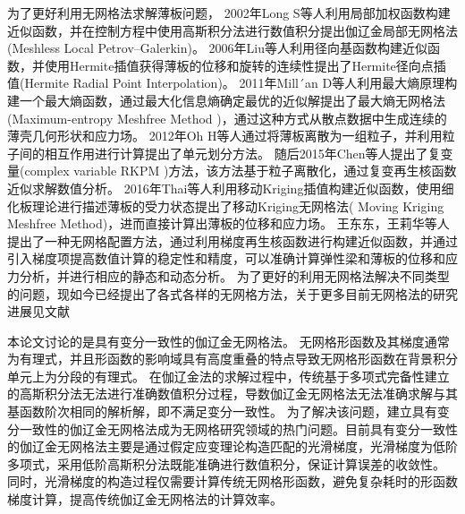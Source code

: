 为了更好利用无网格法求解薄板问题，
2002年Long S等人\textsuperscript{\cite{long2002}}利用局部加权函数构建近似函数，并在控制方程中使用高斯积分法进行数值积分提出伽辽金局部无网格法(Meshless Local Petrov–Galerkin)。
2006年Liu等人\textsuperscript{\cite{liu2006}}利用径向基函数构建近似函数，并使用Hermite插值获得薄板的位移和旋转的连续性提出了Hermite径向点插值(Hermite Radial Point Interpolation)。
2011年Mill´an D等人\textsuperscript{\cite{millan2011}}利用最大熵原理构建一个最大熵函数，通过最大化信息熵确定最优的近似解提出了最大熵无网格法(Maximum-entropy Meshfree  Method )，通过这种方式从散点数据中生成连续的薄壳几何形状和应力场。
2012年Oh H等人\textsuperscript{\cite{oh2012}}通过将薄板离散为一组粒子，并利用粒子间的相互作用进行计算提出了单元划分方法。
随后2015年Chen等人\textsuperscript{\cite{chen2015}}提出了复变量(complex variable RKPM )方法，该方法基于粒子离散化，通过复变再生核函数近似求解数值分析。
2016年Thai等人\textsuperscript{\cite{thai2016}}利用移动Kriging插值构建近似函数，使用细化板理论进行描述薄板的受力状态提出了移动Kriging无网格法( Moving Kriging Meshfree Method)，进而直接计算出薄板的位移和应力场。
王东东，王莉华等人\textsuperscript{\cite{wang2020,wang2021}}提出了一种无网格配置方法，通过利用梯度再生核函数进行构建近似函数，并通过引入梯度项提高数值计算的稳定性和精度，可以准确计算弹性梁和薄板的位移和应力分析，并进行相应的静态和动态分析。
为了更好的利用无网格法解决不同类型的问题，现如今已经提出了各式各样的无网格方法\textsuperscript{\cite{ChengYuMin2005,TanXianYun2011,LianYanPing2013,ZhangXiong2017,GaoXiaoWei2019}}，关于更多目前无网格法的研究进展见文献\textsuperscript{\cite{nguyen2008,liu2009,张雄2009无网格法的理论及应用,wang2014,yreux2017,koester2019,rohit2018,王莉华2021配点型无网格法理论和研究进展,LiuYuXiang2021,朱志辉2021基于,sriram2021,ChenJian2022,LiYuDong2022}}
\par
本论文讨论的是具有变分一致性的伽辽金无网格法\textsuperscript{\cite{babuska2008,wu2021}}。
无网格形函数及其梯度通常为有理式，并且形函数的影响域具有高度重叠的特点导致无网格形函数在背景积分单元上为分段的有理式。
在伽辽金法的求解过程中，传统基于多项式完备性建立的高斯积分法无法进行准确数值积分过程，导数伽辽金无网格法无法准确求解与其基函数阶次相同的解析解，即不满足变分一致性\textsuperscript{\cite{1999Numerical}}。
为了解决该问题，建立具有变分一致性的伽辽金无网格法成为无网格研究领域的热门问题。目前具有变分一致性的伽辽金无网格法主要是通过假定应变理论构造匹配的光滑梯度，光滑梯度为低阶多项式，采用低阶高斯积分法既能准确进行数值积分，保证计算误差的收敛性。
同时，光滑梯度的构造过程仅需要计算传统无网格形函数，避免复杂耗时的形函数梯度计算，提高传统伽辽金无网格法的计算效率。
